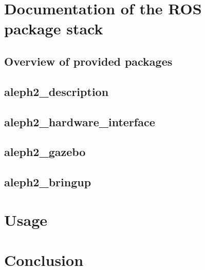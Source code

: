 \documentclass[english,inz,shortabstract]{iithesis}
\begin{document}
\chapter{Documentation of the ROS package stack}

\section{Overview of provided packages}

\section{aleph2\_description}

\section{aleph2\_hardware\_interface}

\section{aleph2\_gazebo}

\section{aleph2\_bringup}

\chapter{Usage}

\chapter{Conclusion}



\end{document}
